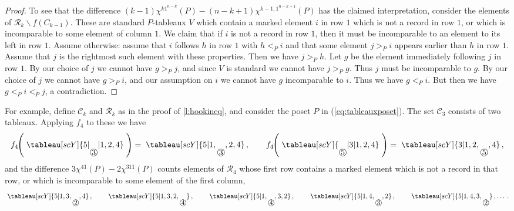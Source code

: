 \documentclass[12pt]{amsart}
\numberwithin{equation}{section}
\newcommand{\ntksp}{\negthickspace}
\newcommand{\ssm}{\smallsetminus}
\newcommand{\circd}[1]{\raisebox{-9pt}{\textcircled{\raisebox{-.9pt}{#1}}}}
\begin{document}
\begin{proof}
  To see that the difference
  $(k-1) \chi^{k1^{n-k}}(P) - (n-k+1) \chi^{k-1,1^{n-k+1}}(P)$
  has the claimed interpretation, consider the
  elements of $\mathcal R_k \ssm f(C_{k-1})$.
  These are standard $P$-tableaux $V$
  which contain a marked element $i$ in row $1$
  which is not a record in row $1$, or which is incomparable to
  some element of column $1$.  We claim that if $i$ is
  not a record in row $1$, then it must
  be incomparable to an element to its left in row $1$.
  Assume otherwise: assume that $i$ follows $h$ in row $1$ with $h <_P i$
  and that some element $j >_P i$ appears earlier than $h$ in row $1$.
  Assume that $j$ is the rightmost such element with these properties.
  Then we have $j >_P h$.
  Let $g$ be the element immediately following $j$ in row $1$.
  By our choice of $j$ we cannot have $g >_P j$,
  and since $V$ is standard we cannot have $j >_P g$.
  Thus $j$ must be incomparable to $g$.
  By our choice of $j$ we cannot have $g >_P i$,
  and our assumption on $i$ we cannot have $g$ incomparable to $i$.
  Thus we have $g <_P i$.  But then we have $g <_P i <_P j$, a contradiction.
\end{proof}
For example, define $\mathcal C_k$ and $\mathcal R_k$ as in the proof
of \ref{l:hookineq}, and consider
the poset $P$ in (\ref{eq:tableauxposet}).
The set $\mathcal C_3$
consists of two tableaux.  Applying $f_4$ to these we have
\begin{equation*}
  f_4\ntksp\left( \;\tableau[scY]{5|\circd3|1,2,4}\; \right) =
  \;\tableau[scY]{5|1,\circd3,2,4}\,, \qquad
  f_4\ntksp\left( \;\tableau[scY]{\circd 5|3|1,2,4}\; \right) =
  \;\tableau[scY]{3|1,2,\circd5,4}\,,
\end{equation*}
and the difference
$3 \chi^{41}(P) - 2 \chi^{311}(P)$ counts elements of $\mathcal R_4$
whose first row contains a marked element which is not a record
in that row, or which is incomparable to some element of the first column,
\begin{equation*}
  \;\tableau[scY]{5|1,3,\circd2,4}\,, \qquad
  \;\tableau[scY]{5|1,3,2,\circd4}\,, \qquad
  \;\tableau[scY]{5|1,\circd4,3,2}\,, \qquad
  \;\tableau[scY]{5|1,4,\circd3,2}\,, \qquad
  \;\tableau[scY]{5|1,4,3,\circd2}\,, \dotsc.
  \end{equation*}
\end{document}
